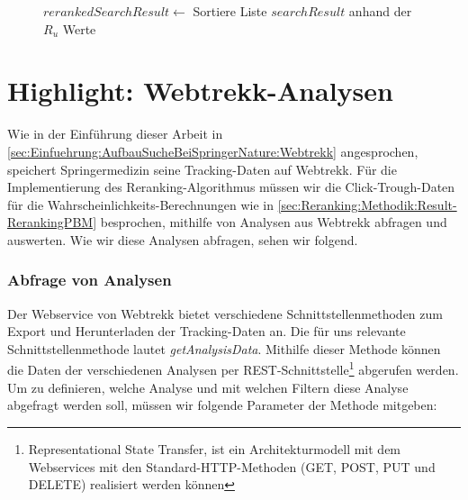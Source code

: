 \begin{figure}[H]
\begin{algorithm}[H]
{{{			\BlankLine
			$rerankedSearchResult \leftarrow$ Sortiere Liste $searchResult$ anhand der $R_{u}$ Werte\;
		}{	
		}
	}{
	}
}
\end{algorithm}
\end{figure}

\section{Highlight: Webtrekk-Analysen}
\label{sec:Implementierung:Webtrekk}

Wie in der Einführung dieser Arbeit in \ref{sec:Einfuehrung:AufbauSucheBeiSpringerNature:Webtrekk} angesprochen, speichert Springermedizin seine Tracking-Daten auf Webtrekk. Für die Implementierung des Reranking-Algorithmus müssen wir die Click-Trough-Daten für die Wahrscheinlichkeits-Berechnungen wie in \ref{sec:Reranking:Methodik:Result-RerankingPBM} besprochen, mithilfe von Analysen aus Webtrekk abfragen und auswerten. Wie wir diese Analysen abfragen, sehen wir folgend.

\subsubsection{Abfrage von Analysen}
\label{sec:Implementierung:Webtrekk:AnalysenAbfragen}

Der Webservice von Webtrekk bietet verschiedene Schnittstellenmethoden zum Export und Herunterladen der Tracking-Daten an. Die für uns relevante Schnittstellenmethode lautet \textit{getAnalysisData}. Mithilfe dieser Methode können die Daten der verschiedenen Analysen per REST-Schnittstelle\footnote{Representational State Transfer, ist ein Architekturmodell mit dem Webservices mit den Standard-HTTP-Methoden (GET, POST, PUT und DELETE) realisiert werden können} abgerufen werden. Um zu definieren, welche Analyse und mit welchen Filtern diese Analyse abgefragt werden soll, müssen wir folgende Parameter der Methode mitgeben: 

